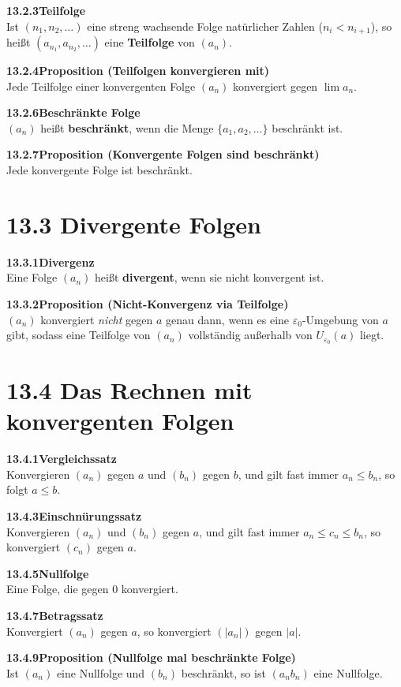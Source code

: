 \documentclass[a4paper,12pt]{article}
\newcommand{\gentry}[3]{%
  \noindent\textbf{#1\quad #2}\nopagebreak\\[0.2em]
  #3\par\smallskip
}
\begin{document}
\gentry{13.2.3}{Teilfolge}{%
  Ist $(n_1, n_2, \ldots)$ eine streng wachsende Folge natürlicher Zahlen ($n_i < n_{i+1}$),
  so heißt $(a_{n_1}, a_{n_2}, \ldots)$ eine \textbf{Teilfolge} von $(a_n)$.
}

\gentry{13.2.4}{Proposition (Teilfolgen konvergieren mit)}{%
  Jede Teilfolge einer konvergenten Folge $(a_n)$ konvergiert gegen $\lim a_n$.
}

\gentry{13.2.6}{Beschränkte Folge}{%
  $(a_n)$ heißt \textbf{beschränkt}, wenn die Menge $\{a_1, a_2, \ldots\}$ beschränkt ist.
}

\gentry{13.2.7}{Proposition (Konvergente Folgen sind beschränkt)}{%
  Jede konvergente Folge ist beschränkt.
}

\section*{13.3 \quad Divergente Folgen}

\gentry{13.3.1}{Divergenz}{%
  Eine Folge $(a_n)$ heißt \textbf{divergent}, wenn sie nicht konvergent ist.
}

\gentry{13.3.2}{Proposition (Nicht-Konvergenz via Teilfolge)}{%
  $(a_n)$ konvergiert \emph{nicht} gegen $a$ genau dann, wenn es eine $\varepsilon_0$-Umgebung
  von $a$ gibt, sodass eine Teilfolge von $(a_n)$ vollständig außerhalb von $U_{\varepsilon_0}(a)$ liegt.
}

\section*{13.4 \quad Das Rechnen mit konvergenten Folgen}

\gentry{13.4.1}{Vergleichssatz}{%
  Konvergieren $(a_n)$ gegen $a$ und $(b_n)$ gegen $b$, und gilt fast immer $a_n \leq b_n$,
  so folgt $a \leq b$.
}

\gentry{13.4.3}{Einschnürungssatz}{%
  Konvergieren $(a_n)$ und $(b_n)$ gegen $a$, und gilt fast immer $a_n \leq c_n \leq b_n$,
  so konvergiert $(c_n)$ gegen $a$.
}

\gentry{13.4.5}{Nullfolge}{%
  Eine Folge, die gegen $0$ konvergiert.
}

\gentry{13.4.7}{Betragssatz}{%
  Konvergiert $(a_n)$ gegen $a$, so konvergiert $(|a_n|)$ gegen $|a|$.
}

\gentry{13.4.9}{Proposition (Nullfolge mal beschränkte Folge)}{%
  Ist $(a_n)$ eine Nullfolge und $(b_n)$ beschränkt, so ist $(a_n b_n)$ eine Nullfolge.
}
\end{document}
